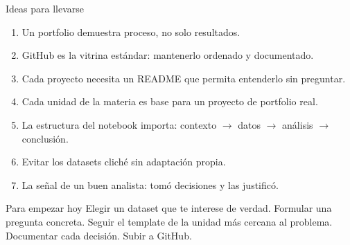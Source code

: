 \documentclass[aspectratio=169]{beamer}
\begin{document}
\begin{frame}{Ideas para llevarse}
  \begin{enumerate}
    \item Un portfolio demuestra proceso, no solo resultados.
    \item GitHub es la vitrina estándar: mantenerlo ordenado y documentado.
    \item Cada proyecto necesita un README que permita entenderlo sin preguntar.
    \item Cada unidad de la materia es base para un proyecto de portfolio real.
    \item La estructura del notebook importa: contexto $\rightarrow$ datos $\rightarrow$ análisis $\rightarrow$ conclusión.
    \item Evitar los datasets cliché sin adaptación propia.
    \item La señal de un buen analista: tomó decisiones y las justificó.
  \end{enumerate}

  \bigskip
  \begin{exampleblock}{Para empezar hoy}
    Elegir un dataset que te interese de verdad. Formular una pregunta concreta. Seguir el template de la unidad más cercana al problema. Documentar cada decisión. Subir a GitHub.
  \end{exampleblock}
\end{frame}
\end{document}

